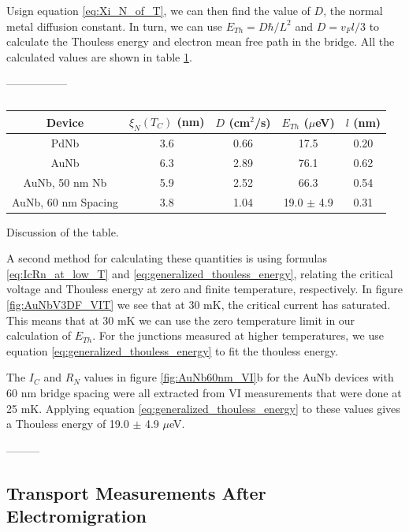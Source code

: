 Usign equation \ref{eq:Xi_N_of_T}, we can then find the value of $D$, the normal metal diffusion constant. In turn, we can use $E_{Th} = D\hbar/L^2$ and $D = v_Fl/3$ to calculate the Thouless energy and electron mean free path in the bridge. All the calculated values are shown in table \ref{tab:likharev_table}.

-----------------

\begin{table}[H]
\caption{}
\label{tab:likharev_table}
\centering
\begin{tabular}{|c|c|c|c|c|}
\hline 
Device & $\xi_N(T_C)$ (nm) & $D$ (cm$^2$/s) & $E_{Th}$ ($\mu$eV) & $l$ (nm) \\ 
\hline 
PdNb & 3.6 & 0.66 & 17.5 & 0.20 \\ 
\hline 
AuNb & 6.3 & 2.89 & 76.1 & 0.62 \\ 
\hline 
AuNb, 50 nm Nb & 5.9 & 2.52 & 66.3 & 0.54 \\ 
\hline 
AuNb, 60 nm Spacing & 3.8 & 1.04 & 19.0 $\pm$ 4.9 & 0.31 \\ 
\hline 
\end{tabular} 

\end{table}

Discussion of the table.


\noindent A second method for calculating these quantities is using formulas \ref{eq:IcRn_at_low_T} and \ref{eq:generalized_thouless_energy}, relating the critical voltage and Thouless energy at zero and finite temperature, respectively. In figure \ref{fig:AuNbV3DF_VIT} we see that at 30 mK, the critical current has saturated. This means that at 30 mK we can use the zero temperature limit in our calculation of $E_{Th}$. For the junctions measured at higher temperatures, we use equation \ref{eq:generalized_thouless_energy} to fit the thouless energy.

The $I_C$ and $R_N$ values in figure \ref{fig:AuNb60nm_VI}b for the AuNb devices with 60 nm bridge spacing were all extracted from VI measurements that were done at 25 mK. Applying equation \ref{eq:generalized_thouless_energy} to these values gives a Thouless energy of 19.0 $\pm$ 4.9 $\mu$eV.


---------
 \fi

\subsection{Transport Measurements After Electromigration}

